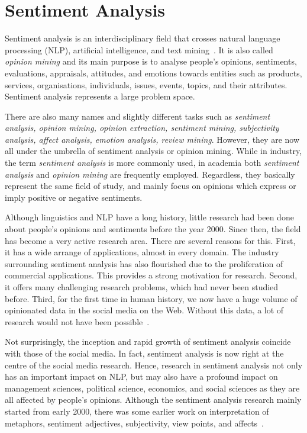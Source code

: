 \section{Sentiment Analysis}
\label{sec:analysis}

Sentiment analysis is an interdisciplinary field
that crosses natural language processing (NLP),
artificial intelligence, and text mining~\cite{Dri18}.
It is also called \emph{opinion mining} and its main purpose is
to analyse people's opinions, sentiments, evaluations, appraisals, attitudes, and emotions towards entities such as products, services,
organisations, individuals, issues, events, topics, and their attributes.
Sentiment analysis represents a large problem space.

There are also many names and slightly different tasks
such as \emph{sentiment analysis, opinion mining, opinion extraction, sentiment mining, subjectivity analysis, affect analysis, emotion analysis,
review mining}.
However, they are now all under the umbrella
of sentiment analysis or opinion mining.
While in industry, the term \emph{sentiment analysis} is more commonly used,
in academia both \emph{sentiment analysis}
and \emph{opinion mining} are frequently employed.
Regardless, they basically represent the same field of study,
and mainly focus on opinions
which express or imply positive or negative sentiments.

Although linguistics and NLP have a long history,
little research had been done about people's opinions and sentiments
before the year 2000.
Since then, the field has become a very active research area.
There are several reasons for this.
First, it has a wide arrange of applications, almost in every domain.
The industry surrounding sentiment analysis has also flourished
due to the proliferation of commercial applications.
This provides a strong motivation for research.
Second, it offers many challenging research problems,
which had never been studied before.
Third, for the first time in human history,
we now have a huge volume of opinionated data in the social media on the Web. Without this data, a lot of research would not have been possible~\cite{Liu12}.

Not surprisingly, the inception and rapid growth of sentiment analysis coincide with those of the social media.
In fact, sentiment analysis is now right at the centre
of the social media research.
Hence, research in sentiment analysis not only has an important impact on NLP, but may also have a profound impact on management sciences,
political science, economics, and social sciences
as they are all affected by people's opinions.
Although the sentiment analysis research mainly started from early 2000,
there was some earlier work on interpretation of metaphors,
sentiment adjectives, subjectivity, view points, and affects~\cite{HM97,Hea92,WBO99}.

